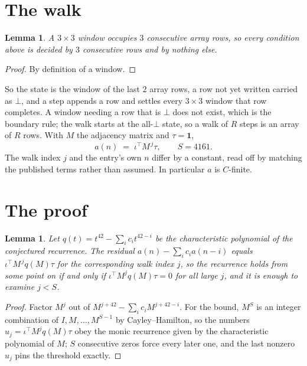 \documentclass[11pt,a4paper]{article}
\theoremstyle{plain}
\newtheorem{lemma}[theorem]{Lemma}
\theoremstyle{definition}
\begin{document}
\section{The walk}

\begin{lemma}\label{lem:win}
A $3\times3$ window occupies $3$ consecutive array rows, so every condition above is
decided by $3$ consecutive rows and by nothing else.
\end{lemma}

\begin{proof}
By definition of a window.
\end{proof}

So the state is the window of the last $2$ array rows, a row not yet written carried as
$\bot$, and a step appends a row and settles every $3\times3$ window that row completes. A
window needing a row that is $\bot$ does not exist, which is the boundary rule; the walk starts
at the all-$\bot$ state, so a walk of $R$ steps is an array of $R$ rows. With $M$ the adjacency
matrix and $\tau=\mathbf{1}$,
\[
a(n)\;=\;\iota^{\!\top}M^{\,j}\tau ,\qquad S=4161.
\]
The walk index $j$ and the entry's own $n$ differ by a constant, read off by matching the
published terms rather than assumed. In particular $a$ is $C$-finite.

\section{The proof}

\begin{lemma}\label{lem:crit}
Let $q(t)=t^{42}-\sum_i c_it^{42-i}$ be the characteristic polynomial of the
conjectured recurrence. The residual $a(n)-\sum_ic_ia(n-i)$ equals
$\iota^{\!\top}M^{\,j}q(M)\tau$ for the corresponding walk index $j$, so the recurrence
holds from some point on if and only if $\iota^{\!\top}M^{j}q(M)\tau=0$ for all large $j$,
and it is enough to examine $j<S$.
\end{lemma}

\begin{proof}
Factor $M^{j}$ out of $M^{j+42}-\sum_ic_iM^{j+42-i}$. For the bound, $M^{S}$
is an integer combination of $I,M,\dots,M^{S-1}$ by Cayley--Hamilton, so the numbers
$u_j=\iota^{\!\top}M^{j}q(M)\tau$ obey the monic recurrence given by the characteristic
polynomial of $M$; $S$ consecutive zeros force every later one, and the last nonzero $u_j$
pins the threshold exactly.
\end{proof}
\end{document}
